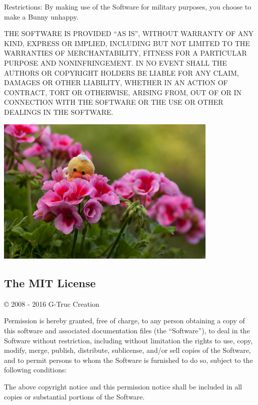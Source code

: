 \documentclass{scrartcl}
\numberwithin{figure}{subsection}
\begin{document}
Restrictions: By making use of the Software for military purposes, you choose to make a Bunny unhappy.

THE SOFTWARE IS PROVIDED \enquote{AS IS}, WITHOUT WARRANTY OF ANY KIND, EXPRESS OR IMPLIED, INCLUDING BUT NOT LIMITED TO THE WARRANTIES OF MERCHANTABILITY, FITNESS FOR A PARTICULAR PURPOSE AND NONINFRINGEMENT. IN NO EVENT SHALL THE AUTHORS OR COPYRIGHT HOLDERS BE LIABLE FOR ANY CLAIM, DAMAGES OR OTHER LIABILITY, WHETHER IN AN ACTION OF CONTRACT, TORT OR OTHERWISE, ARISING FROM, OUT OF OR IN CONNECTION WITH THE SOFTWARE OR THE USE OR OTHER DEALINGS IN THE SOFTWARE.

\begin{center}
    \includegraphics[width=0.8\textwidth]{duck-large1}
\end{center}

\pagebreak{}

\subsection*{\hypertarget{mit}{The MIT License}}

\copyright{} 2008 - 2016 G-Truc Creation

Permission is hereby granted, free of charge, to any person obtaining a copy of this software and associated documentation files (the \enquote{Software}), to deal in the Software without restriction, including without limitation the rights to use, copy, modify, merge, publish, distribute, sublicense, and/or sell copies of the Software, and to permit persons to whom the Software is furnished to do so, subject to the following conditions:

The above copyright notice and this permission notice shall be included in all copies or substantial portions of the Software.
\end{document}
